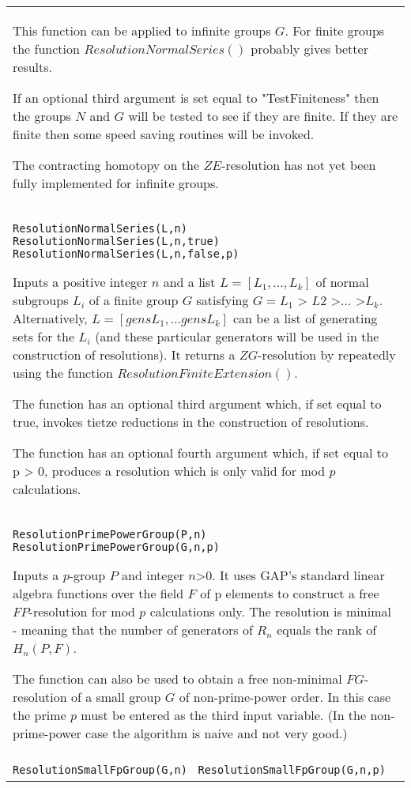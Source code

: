 \documentclass[a4paper,11pt]{report}
\begin{document}
{\begin{center}
\begin{tabular}{|l|}
 This function can be applied to infinite groups $G$. For finite groups the function $ResolutionNormalSeries()$ probably gives better results.

 If an optional third argument is set equal to "TestFiniteness" then the groups $N$ and $G$ will be tested to see if they are finite. If they are finite then some speed
saving routines will be invoked.

 The contracting homotopy on the $ZE$-resolution has not yet been fully implemented for infinite groups. \\
 \index{ResolutionNormalSeries} \texttt{ResolutionNormalSeries(L,n) } \texttt{ResolutionNormalSeries(L,n,true)} \texttt{ResolutionNormalSeries(L,n,false,p)} 

 Inputs a positive integer $n$ and a list $L = [L_1 , ..., L_k]$ of normal subgroups $L_i$ of a finite group $G$ satisfying $G = L_1$ {\textgreater} $L2$ {\textgreater}$ \ldots $ {\textgreater}$ L_k$. Alternatively, $L = [gensL_1, ... gensL_k]$ can be a list of generating sets for the $L_i$ (and these particular generators will be used in the construction of
resolutions). It returns a $ZG$-resolution by repeatedly using the function $ResolutionFiniteExtension()$.

 The function has an optional third argument which, if set equal to true,
invokes tietze reductions in the construction of resolutions.

 The function has an optional fourth argument which, if set equal to p
{\textgreater} 0, produces a resolution which is only valid for mod $p$ calculations. \\
 \index{ResolutionPrimePowerGroup} \texttt{ResolutionPrimePowerGroup(P,n) } \texttt{ResolutionPrimePowerGroup(G,n,p)} 

 Inputs a $p$-group $P$ and integer $n${\textgreater}$0$. It uses GAP's standard linear algebra functions over the field $F$ of p elements to construct a free $FP$-resolution for mod $p$ calculations only. The resolution is minimal - meaning that the number of
generators of $R_n$ equals the rank of $H_n(P,F)$. 

 The function can also be used to obtain a free non-minimal $FG$-resolution of a small group $G$ of non-prime-power order. In this case the prime $p$ must be entered as the third input variable. (In the non-prime-power case the
algorithm is naive and not very good.) \\
 \index{ResolutionSmallFpGroup} \texttt{ResolutionSmallFpGroup(G,n) } \texttt{ResolutionSmallFpGroup(G,n,p) } 


\end{tabular}
\end{center}}
\end{document}
